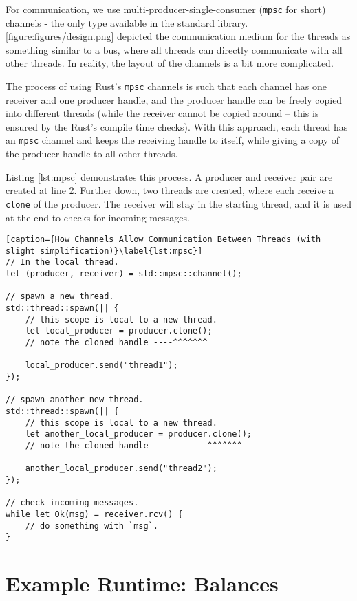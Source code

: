 For communication, we use multi-producer-single-consumer\cite{StdSyncMpsc} (\texttt{mpsc} for short)
channels - the only type available in the standard library.
\ref{figure:figures/design.png} depicted the communication medium for the threads as something
similar to a bus, where all threads can directly communicate with all other threads. In reality, the
layout of the channels is a bit more complicated.

The process of using Rust's \texttt{mpsc} channels is such that each channel has one receiver and one
producer handle, and the producer handle can be freely copied into different threads (while the
receiver cannot be copied around -- this is ensured by the Rust's compile time checks). With this
approach, each thread has an \texttt{mpsc} channel and keeps the receiving handle to itself,
while giving a copy of the producer handle to all other threads.

Listing \ref{lst:mpsc} demonstrates this process. A producer and receiver pair are created at line 2. Further down, two threads are created, where each receive a \texttt{clone} of the producer. The receiver will stay in the starting thread, and it is used at the end to checks for incoming messages.

\begin{lstlisting}[caption={How Channels Allow Communication Between Threads (with slight simplification)}\label{lst:mpsc}]
// In the local thread.
let (producer, receiver) = std::mpsc::channel();

// spawn a new thread.
std::thread::spawn(|| {
	// this scope is local to a new thread.
	let local_producer = producer.clone();
	// note the cloned handle ----^^^^^^^

	local_producer.send("thread1");
});

// spawn another new thread.
std::thread::spawn(|| {
	// this scope is local to a new thread.
	let another_local_producer = producer.clone();
	// note the cloned handle -----------^^^^^^^

	another_local_producer.send("thread2");
});

// check incoming messages.
while let Ok(msg) = receiver.rcv() {
	// do something with `msg`.
}
\end{lstlisting}


\section{Example Runtime: Balances} \label{chap_impl:sec:balances}

